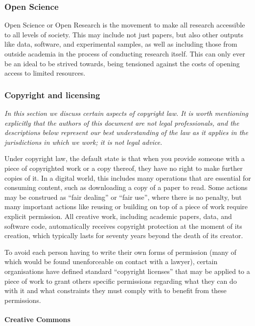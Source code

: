 \documentclass{article}
\begin{document}
\subsubsection{Open Science}

Open Science or Open Research is
the movement to make all research accessible to all levels of society.
This may include not just papers,
but also other outputs like data, software, and experimental samples,
as well as including those from outside academia in
the process of conducting research itself.
This can only ever be an ideal to be strived towards,
being tensioned against the costs of opening access to limited resources.

\subsubsection{Copyright and licensing}

\emph{
  In this section we discuss certain aspects of copyright law.
  It is worth mentioning explicitly that
  the authors of this document are not legal professionals,
  and the descriptions below represent our best understanding of the law
  as it applies in the jurisdictions in which we work;
  it is not legal advice.
}

Under copyright law,
the default state is that
when you provide someone with a piece of copyrighted work
or a copy thereof,
they have no right to make further copies of it.
In a digital world,
this includes many operations that are essential for consuming content,
such as downloading a copy of a paper to read.
Some actions may be construed as ``fair dealing'' or ``fair use'',
where there is no penalty,
but many important actions
like reusing or building on top of a piece of work
require explicit permission.
All creative work,
including academic papers, data, and software code,
automatically receives copyright protection at the moment of its creation,
which typically lasts for seventy years beyond the death of its creator.

To avoid each person having to write their own forms of permission
(many of which would be found unenforceable on contact with a lawyer),
certain organisations have defined standard ``copyright licenses''
that may be applied to a piece of work
to grant others specific permissions regarding what they can do with it
and what constraints they must comply with to benefit from these permissions.

\paragraph{Creative Commons}
\end{document}
